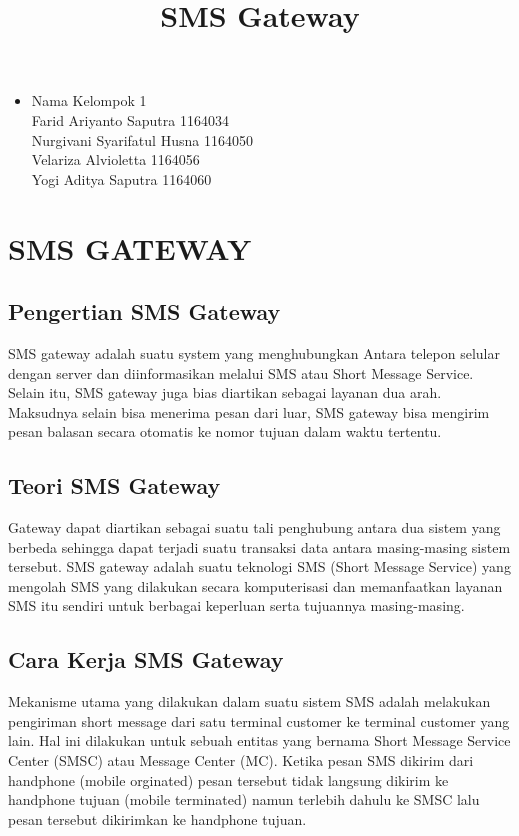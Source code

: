 \documentclass[12pt,a4paper]{article}
\begin{document}
\title{SMS Gateway}
\maketitle

\begin{itemize}
\item
Nama Kelompok 1\\
Farid Ariyanto Saputra 1164034\\
Nurgivani Syarifatul Husna 1164050\\
Velariza Alvioletta 1164056\\
Yogi Aditya Saputra 1164060 \\
\end{itemize}

\section{SMS GATEWAY}
\subsection{Pengertian SMS Gateway}
SMS gateway adalah suatu system yang menghubungkan Antara telepon selular dengan server dan diinformasikan melalui SMS atau Short Message Service. Selain itu, SMS gateway juga bias diartikan sebagai layanan dua arah. Maksudnya selain bisa menerima pesan dari luar,  SMS gateway bisa mengirim pesan balasan secara otomatis ke nomor tujuan dalam waktu tertentu.
\subsection{Teori SMS Gateway}
Gateway dapat diartikan sebagai suatu tali penghubung antara dua sistem yang berbeda sehingga dapat terjadi suatu transaksi data antara masing-masing sistem tersebut. SMS gateway adalah suatu teknologi SMS (Short Message Service) yang mengolah SMS yang dilakukan secara komputerisasi dan memanfaatkan layanan SMS itu sendiri untuk berbagai keperluan serta tujuannya masing-masing.
\subsection{Cara Kerja SMS Gateway}
Mekanisme utama yang dilakukan dalam suatu sistem SMS adalah melakukan pengiriman short message dari satu terminal customer ke terminal customer yang lain. Hal ini dilakukan untuk sebuah entitas yang bernama  Short Message Service Center (SMSC) atau Message Center (MC). Ketika pesan SMS dikirim dari handphone (mobile orginated) pesan tersebut tidak langsung dikirim ke handphone tujuan (mobile terminated) namun terlebih dahulu ke SMSC lalu pesan tersebut dikirimkan ke handphone tujuan.
\end{document}
